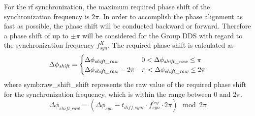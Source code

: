 For the rf synchronization, the maximum required phase shift of the synchronization frequency is $2\pi$. In order to accomplish the phase alignment as fast as possible, the phase shift will be conducted backward or forward. Therefore a phase shift of up to $\pm \pi$ will be considered for the Group DDS with regard to the synchronization frequency $f_\mathit{syn}^X$. The required phase shift is calculated as
\begin{eqnarray}\Delta \phi_\mathit{shift}=
\begin{cases} 


\Delta \phi_\mathit{shift\_raw} & 0<\Delta \phi_\mathit{shift\_raw}\le\pi \cr

\Delta \phi_\mathit{shift\_raw} -2\pi &  \pi<\Delta \phi_\mathit{shift\_raw}\le2\pi 


\label{phase_shift_eq}
\end{cases}
\end{eqnarray}
where \gls{symb:raw_shift_shift} represents the raw value of the required phase shift for the synchronization frequency, which is within the range between $0$ and $2\pi$.
 \begin{equation}
\Delta \phi_\mathit{shift\_raw}= (\Delta \phi_\mathit{syn}-t_{\mathit{diff\_sync}}  \cdot f_\mathit{syn}^\mathit{trg}\cdot 2\pi) \mod 2\pi 
\end{equation}

